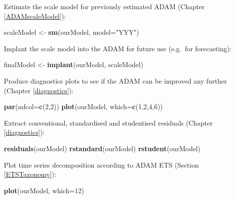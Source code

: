 \documentclass[]{book}
\newenvironment{Shaded}{\begin{snugshade}}{\end{snugshade}}
\newcommand{\DataTypeTok}[1]{\textcolor[rgb]{0.13,0.29,0.53}{#1}}
\newcommand{\DecValTok}[1]{\textcolor[rgb]{0.00,0.00,0.81}{#1}}
\newcommand{\KeywordTok}[1]{\textcolor[rgb]{0.13,0.29,0.53}{\textbf{#1}}}
\newcommand{\NormalTok}[1]{#1}
\newcommand{\StringTok}[1]{\textcolor[rgb]{0.31,0.60,0.02}{#1}}
\theoremstyle{definition}
\theoremstyle{definition}
\theoremstyle{definition}
\theoremstyle{definition}
\theoremstyle{remark}
\begin{document}
Estimate the scale model for previously estimated ADAM (Chapter \ref{ADAMscaleModel}):

\begin{Shaded}
\begin{Highlighting}[]
\NormalTok{scaleModel <-}\StringTok{ }\KeywordTok{sm}\NormalTok{(ourModel, }\DataTypeTok{model=}\StringTok{"YYY"}\NormalTok{)}
\end{Highlighting}
\end{Shaded}

Implant the scale model into the ADAM for future use (e.g.~for forecasting):

\begin{Shaded}
\begin{Highlighting}[]
\NormalTok{finalModel <-}\StringTok{ }\KeywordTok{implant}\NormalTok{(ourModel, scaleModel)}
\end{Highlighting}
\end{Shaded}

Produce diagnostics plots to see if the ADAM can be improved any further (Chapter \ref{diagnostics}):

\begin{Shaded}
\begin{Highlighting}[]
\KeywordTok{par}\NormalTok{(}\DataTypeTok{mfcol=}\KeywordTok{c}\NormalTok{(}\DecValTok{2}\NormalTok{,}\DecValTok{2}\NormalTok{))}
\KeywordTok{plot}\NormalTok{(ourModel, }\DataTypeTok{which=}\KeywordTok{c}\NormalTok{(}\DecValTok{1}\NormalTok{,}\DecValTok{2}\NormalTok{,}\DecValTok{4}\NormalTok{,}\DecValTok{6}\NormalTok{))}
\end{Highlighting}
\end{Shaded}

Extract conventional, standardised and studentised residuals (Chapter \ref{diagnostics}):

\begin{Shaded}
\begin{Highlighting}[]
\KeywordTok{residuals}\NormalTok{(ourModel)}
\KeywordTok{rstandard}\NormalTok{(ourModel)}
\KeywordTok{rstudent}\NormalTok{(ourModel)}
\end{Highlighting}
\end{Shaded}

Plot time series decomposition according to ADAM ETS (Section \ref{ETSTaxonomy}):

\begin{Shaded}
\begin{Highlighting}[]
\KeywordTok{plot}\NormalTok{(ourModel, }\DataTypeTok{which=}\DecValTok{12}\NormalTok{)}
\end{Highlighting}
\end{Shaded}
\end{document}

